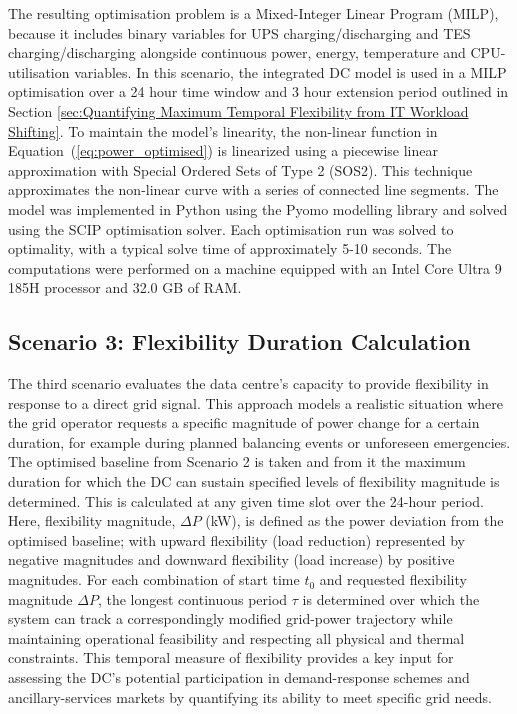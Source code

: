 \documentclass[lettersize,journal]{IEEEtran}
\newcommand{\rev}[1]{\textcolor{blue!70!black}{#1}}
\begin{document}
\rev{The resulting optimisation problem is a Mixed-Integer Linear Program (MILP), because it includes binary variables for UPS charging/discharging and TES charging/discharging alongside continuous power, energy, temperature and CPU-utilisation variables.} In this scenario, the integrated DC model is used in a MILP optimisation over a 24 hour time window and 3 hour extension period outlined in Section \ref{sec:Quantifying Maximum Temporal Flexibility from IT Workload Shifting}. To maintain the model's linearity, the non-linear function in Equation~(\ref{eq:power_optimised}) is linearized using a piecewise linear approximation with Special Ordered Sets of Type 2 (SOS2). This technique approximates the non-linear curve with a series of connected line segments. The model was implemented in Python using the Pyomo modelling library and solved using the SCIP optimisation solver. Each optimisation run was solved to optimality, with a typical solve time of approximately 5-10 seconds. The computations were performed on a machine equipped with an Intel Core Ultra 9 185H processor and 32.0 GB of RAM.



\subsection{Scenario 3: Flexibility Duration Calculation}\label{sec:scenario 3}
The third scenario evaluates the data centre's capacity to provide flexibility in response to a direct grid signal. This approach models a realistic situation where the grid operator requests a specific magnitude of power change for a certain duration, for example during planned balancing events or unforeseen emergencies. The optimised baseline from Scenario 2 is taken and from it the maximum duration for which the DC can sustain specified levels of flexibility magnitude is determined. This is calculated at any given time slot over the 24-hour period. Here, flexibility magnitude, $\Delta P$ (kW), is defined as the power deviation from the optimised baseline; with upward flexibility (load reduction) represented by negative magnitudes and downward flexibility (load increase) by positive magnitudes. For each combination of start time $t_0$ and requested flexibility magnitude $\Delta P$, the longest continuous period $\tau$ is determined over which the system can track a correspondingly modified grid-power trajectory while maintaining operational feasibility and respecting all physical and thermal constraints. This temporal measure of flexibility provides a key input for assessing the DC's potential participation in demand-response schemes and ancillary-services markets by quantifying its ability to meet specific grid needs.
\end{document}
